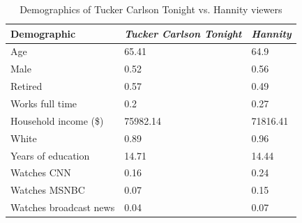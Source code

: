 \begin{table}[!htbp] \centering
\caption{Demographics of Tucker Carlson Tonight vs. Hannity viewers}
\label{t:viewer-characteristics}
\begin{tabular}{@{}lll@{}}
\toprule
\textbf{Demographic} & \textbf{\emph{Tucker Carlson Tonight}} & \textbf{\emph{Hannity}} \\ \midrule
Age & 65.41 & 64.9\\
Male & 0.52 & 0.56\\
Retired & 0.57 & 0.49\\
Works full time & 0.2 & 0.27\\
Household income (\$) & 75982.14 & 71816.41\\
White & 0.89 & 0.96\\
Years of education & 14.71 & 14.44\\
Watches CNN & 0.16 & 0.24\\
Watches MSNBC & 0.07 & 0.15\\
Watches broadcast news & 0.04 & 0.07\\
\bottomrule
\end{tabular}
\end{table}
